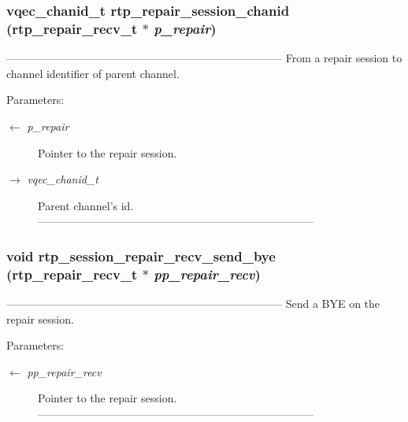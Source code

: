 \subsubsection{\setlength{\rightskip}{0pt plus 5cm}\bf{vqec\_\-chanid\_\-t} rtp\_\-repair\_\-session\_\-chanid (\bf{rtp\_\-repair\_\-recv\_\-t} $\ast$ {\em p\_\-repair})}\label{rtp__repair__recv_8h_4820478135788dfb92428daa334b2ca6}


--------------------------------------------------------------------------- From a repair session to channel identifier of parent channel.

\begin{Desc}
\item[Parameters:]
\begin{description}
\item[\mbox{$\leftarrow$} {\em p\_\-repair}]Pointer to the repair session. \item[\mbox{$\rightarrow$} {\em vqec\_\-chanid\_\-t}]Parent channel's id. --------------------------------------------------------------------------- \end{description}
\end{Desc}
\subsubsection{\setlength{\rightskip}{0pt plus 5cm}void rtp\_\-session\_\-repair\_\-recv\_\-send\_\-bye (\bf{rtp\_\-repair\_\-recv\_\-t} $\ast$ {\em pp\_\-repair\_\-recv})}\label{rtp__repair__recv_8h_a24b309f4dc43c934a1d0d73fb38cccf}


--------------------------------------------------------------------------- Send a BYE on the repair session.

\begin{Desc}
\item[Parameters:]
\begin{description}
\item[\mbox{$\leftarrow$} {\em pp\_\-repair\_\-recv}]Pointer to the repair session. --------------------------------------------------------------------------- \end{description}
\end{Desc}
